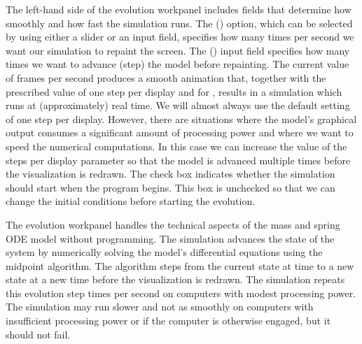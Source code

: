 The left-hand side of the evolution workpanel includes fields that determine how smoothly and how fast the simulation runs.
The  () option, which can be selected by using either a slider or an input field,
specifies how many times per second we want our simulation to repaint the screen. The 
() input field specifies how many times we want to advance (step) the model before repainting. The current
value of  frames per second produces a smooth animation that, together with the prescribed value of one step
per display and  for , results in a simulation which runs  at (approximately) real time. We will
almost always use the default setting of one step per display. However, there are situations where the model's
graphical output consumes a significant amount of processing power and where we want to speed the numerical
computations. In this case we can increase the value of the steps per display parameter so that the model is advanced
multiple times before the visualization is redrawn. The  check box indicates whether the simulation
should start when the program begins. This box is unchecked so that we can change the initial conditions before
starting the evolution.

The evolution workpanel handles the technical aspects of the mass and spring ODE model without programming.  The
simulation advances the state of the system by numerically solving the model's differential equations using the
midpoint algorithm. The algorithm steps from the current state at time  to a new state at a new time
 before the visualization is redrawn. The simulation repeats this evolution step  times per second
on computers with modest processing power. The simulation may run slower and not as smoothly on computers with
insufficient processing power or if the computer is otherwise engaged, but it should not fail.


